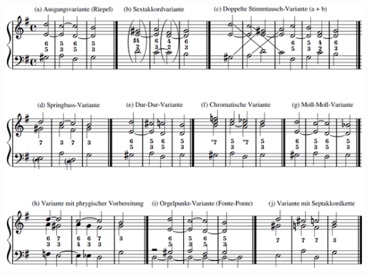 \documentclass[11pt, openany]{article}
\begin{document}
\begin{center}
\includegraphics[scale=1]{fontevar.png}
\end{center}
\end{document}
